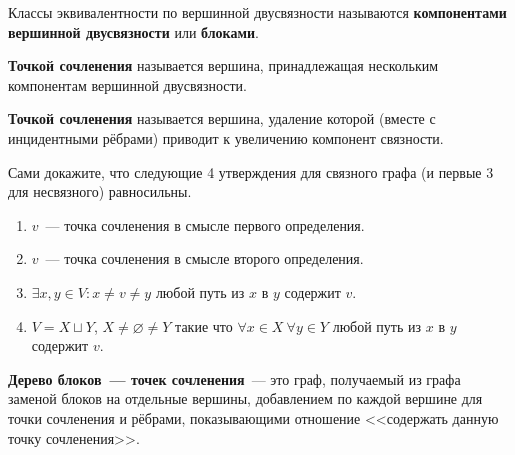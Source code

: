 \documentclass{article}
\begin{document}
    \begin{definition}
        Классы эквивалентности по вершинной двусвязности называются \textbf{компонентами вершинной двусвязности} или \textbf{блоками}.
    \end{definition}
    \begin{definition}
        \textbf{Точкой сочленения} называется вершина, принадлежащая нескольким компонентам вершинной двусвязности.
    \end{definition}
    \begin{definition}
        \textbf{Точкой сочленения} называется вершина, удаление которой (вместе с инцидентными рёбрами) приводит к увеличению компонент связности.
    \end{definition}
    \begin{theorem}
        Сами докажите, что следующие 4 утверждения для связного графа (и первые 3 для несвязного) равносильны.
        \begin{enumerate}
            \item $v$~--- точка сочленения в смысле первого определения.
            \item $v$~--- точка сочленения в смысле второго определения.
            \item $\exists x,y\in V:x\neq v\neq y$ любой путь из $x$ в $y$ содержит $v$.
            \item $V=X\sqcup Y$, $X\neq\varnothing\neq Y$ такие что $\forall x\in X~\forall y\in Y$ любой путь из $x$ в $y$ содержит $v$.
        \end{enumerate}
    \end{theorem}
    \begin{definition}
        \textbf{Дерево блоков~--- точек сочленения}~--- это граф, получаемый из графа заменой блоков на отдельные вершины, добавлением по каждой вершине для точки сочленения и рёбрами, показывающими отношение <<содержать данную точку сочленения>>.
    \end{definition}
\end{document}

